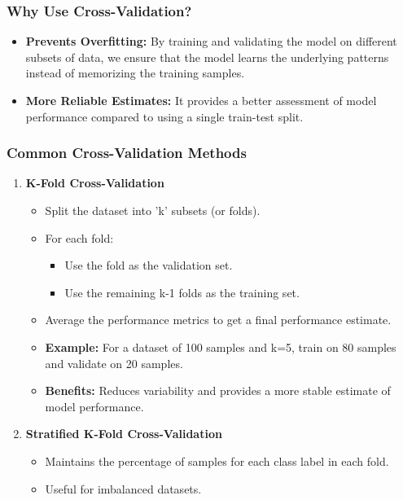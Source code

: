 \documentclass{beamer}
\begin{document}
\begin{frame}[fragile]
    \frametitle{Why Use Cross-Validation?}
    \begin{itemize}
        \item \textbf{Prevents Overfitting:} By training and validating the model on different subsets of data, we ensure that the model learns the underlying patterns instead of memorizing the training samples.
        \item \textbf{More Reliable Estimates:} It provides a better assessment of model performance compared to using a single train-test split.
    \end{itemize}
\end{frame}

\begin{frame}[fragile]
    \frametitle{Common Cross-Validation Methods}
    \begin{enumerate}
        \item \textbf{K-Fold Cross-Validation}
            \begin{itemize}
                \item Split the dataset into 'k' subsets (or folds).
                \item For each fold:
                    \begin{itemize}
                        \item Use the fold as the validation set.
                        \item Use the remaining k-1 folds as the training set.
                    \end{itemize}
                \item Average the performance metrics to get a final performance estimate.
                \item \textbf{Example:} For a dataset of 100 samples and k=5, train on 80 samples and validate on 20 samples.
                \item \textbf{Benefits:} Reduces variability and provides a more stable estimate of model performance.
            \end{itemize}
        
        \item \textbf{Stratified K-Fold Cross-Validation}
            \begin{itemize}
                \item Maintains the percentage of samples for each class label in each fold.
                \item Useful for imbalanced datasets.
            \end{itemize}
        

\end{enumerate}
\end{frame}
\end{document}
